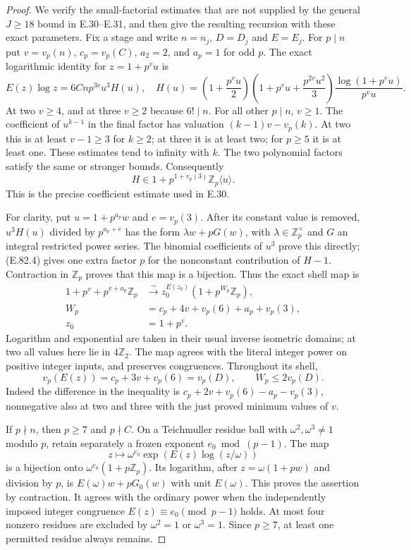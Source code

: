 \begin{proof}
We verify the small-factorial estimates that are not supplied
by the general $J\geq18$ bound in E.30--E.31, and then give
the resulting recursion with these exact parameters.
Fix a stage and write $n=n_j$, $D=D_j$ and $E=E_j$.
For $p\mid n$ put $v=v_p(n)$, $c_p=v_p(C)$,
$a_2=2$, and $a_p=1$ for odd $p$.
The exact logarithmic identity for $z=1+p^vu$ is
\[
 E(z)\log z=6Cn p^{3v}u^3H(u),
 \quad
 H(u)=\left(1+\frac{p^vu}{2}\right)
       \left(1+p^vu+\frac{p^{2v}u^2}{3}\right)
       \frac{\log(1+p^vu)}{p^vu}.
 \tag{E.82.3}
\]
At two $v\geq4$, and at three $v\geq2$ because $6!\mid n$.
For all other $p\mid n$, $v\geq1$.
The coefficient of $u^{k-1}$ in the final factor has valuation
$(k-1)v-v_p(k)$. At two this is at least $v-1\geq3$ for
$k\geq2$; at three it is at least two; for $p\geq5$
it is at least one. These estimates tend to infinity with $k$.
The two polynomial factors satisfy the same or stronger bounds.
Consequently
\[
 H\in1+p^{1+v_p(3)}\mathbb Z_p\langle u\rangle.
 \tag{E.82.4}
\]
This is the precise coefficient estimate used in E.30.

For clarity, put $u=1+p^{a_p}w$ and $e=v_p(3)$.
After its constant value is removed,
$u^3H(u)$ divided by $p^{a_p+e}$ has the form
$\lambda w+pG(w)$, with $\lambda\in\mathbb Z_p^\times$
and $G$ an integral restricted power series. The binomial
coefficients of $u^3$ prove this directly; (E.82.4) gives
one extra factor $p$ for the nonconstant contribution of
$H-1$. Contraction in $\mathbb Z_p$ proves that this map is
a bijection. Thus the exact shell map is
\[
\begin{split}
 1+p^v+p^{v+a_p}\mathbb Z_p&\xrightarrow{\sim}
 z_0^{E(z_0)}(1+p^{W_p}\mathbb Z_p),\\
 W_p&=c_p+4v+v_p(6)+a_p+v_p(3),\\
 z_0&=1+p^v.
\end{split}
\tag{E.82.5}
\]
Logarithm and exponential are taken in their usual inverse
isometric domains; at two all values here lie in $4\mathbb Z_2$.
The map agrees with the literal integer power on positive integer
inputs, and preserves congruences. Throughout its shell,
\[
 v_p(E(z))=c_p+3v+v_p(6)=v_p(D),
 \qquad W_p\leq2v_p(D).
 \tag{E.82.6}
\]
Indeed the difference in the inequality is
$c_p+2v+v_p(6)-a_p-v_p(3)$, nonnegative also at two and
three with the just proved minimum values of $v$.

If $p\nmid n$, then $p\geq7$ and $p\nmid C$.
On a Teichmuller residue ball with $\omega^2,\omega^3\ne1$
modulo $p$, retain separately a frozen exponent
$e_0\bmod(p-1)$. The map
\[
 z\longmapsto\omega^{e_0}
            \exp(E(z)\log(z/\omega))
 \tag{E.82.7}
\]
is a bijection onto $\omega^{e_0}(1+p\mathbb Z_p)$.
Its logarithm, after $z=\omega(1+pw)$ and division by $p$,
is $E(\omega)w+pG_0(w)$ with unit $E(\omega)$.
This proves the assertion by contraction. It agrees with the
ordinary power when the independently imposed integer congruence
$E(z)\equiv e_0\pmod{p-1}$ holds. At most four nonzero
residues are excluded by $\omega^2=1$ or $\omega^3=1$.
Since $p\geq7$, at least one permitted residue always remains.


\end{proof}
